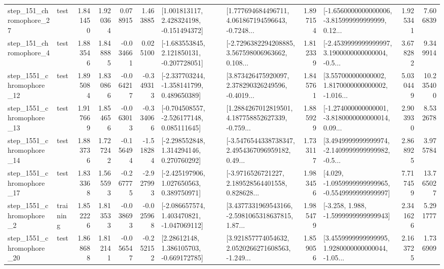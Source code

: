 \begin{tabular}{llrrrrllrlrr}
  step\_151\_chromophore\_27 &      test &      1.841450 &    1.920364 &      0.078915 &  1.463885 &    [1.001813117, 2.428324198, -0.151494372] &  [1.777694684496711, 4.061867194596643, -0.7248... &       1.897154 &  [-1.6560000000000006, -3.815999999999999, 0.12... &            1.925341 &          7.606839 \\
   step\_151\_chromophore\_4 &      test &      1.883546 &    1.848885 &     -0.034661 &  0.025100 &   [-1.683553845, 2.121850131, -0.207728051] &  [-2.7296382294208885, 3.567598006963662, 0.108... &       1.812339 &  [-2.4539999999999997, 3.1900000000000004, -0.5... &            3.678282 &          9.349914 \\
 step\_1551\_chromophore\_12 &      test &      1.895084 &    1.830866 &     -0.064217 & -0.349313 &   [-2.337703244, -1.358141799, 0.489650389] &  [3.873426475920097, 2.378290326249596, -0.4019... &       1.845761 &  [3.557000000000002, 1.8170000000000002, -1.016... &            5.030449 &         10.235400 \\
 step\_1551\_chromophore\_13 &      test &      1.917669 &    1.854656 &     -0.063013 & -0.334066 &   [-0.704508557, -2.526177148, 0.085111645] &  [1.2884267012819501, 4.187758852627339, -0.759... &       1.885929 &  [-1.274000000000001, -3.8180000000000014, 0.09... &            2.903930 &          8.532678 \\
 step\_1551\_chromophore\_14 &      test &      1.883736 &    1.727242 &     -0.156494 & -1.518284 &    [-2.298552848, 1.314294146, 0.270760292] &  [-3.5476544338738347, 2.4954367096959182, 0.49... &       1.733117 &  [3.4949999999999974, -2.1409999999999982, -0.5... &            2.868925 &          3.975784 \\
 step\_1551\_chromophore\_17 &      test &      1.833368 &    1.565593 &     -0.267775 & -2.927993 &    [-2.425197906, 1.027650563, 0.389750971] &  [-3.9716526721227, 2.189528564401558, 0.828628... &       1.983456 &  [4.029, -1.0959999999999965, -0.5549999999999997] &            7.717459 &         13.765027 \\
  step\_1551\_chromophore\_2 &  training &      1.852226 &    1.813533 &     -0.038693 & -0.025968 &   [-2.086657574, 1.403470821, -1.047069112] &  [3.4377331969543166, -2.5981065318637815, 1.87... &       1.985479 &               [-3.258, 1.988, -1.5999999999999943] &            2.341626 &          5.291777 \\
 step\_1551\_chromophore\_20 &      test &      1.868688 &    1.812141 &     -0.056547 & -0.252152 &     [2.28612148, 1.386105703, -0.669172785] &  [3.921857774054632, 2.0520266271608563, -1.249... &       1.859056 &  [3.4559999999999995, 1.9280000000000044, -1.05... &            2.163725 &          1.736909 \\

\end{tabular}
